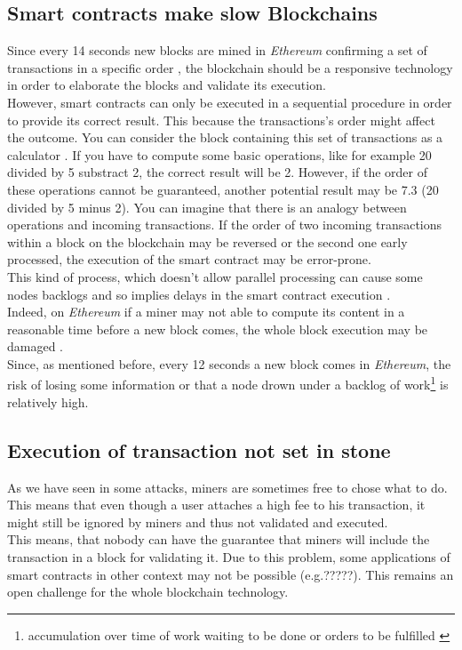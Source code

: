 \subsection{Smart contracts make slow Blockchains}
Since every 14 seconds new blocks are mined in \textit{Ethereum} \cite{sina} confirming a set of transactions in a specific order \cite{challenge3}, the blockchain should be a responsive technology in order to elaborate the blocks and validate its execution. \\
However, smart contracts can only be executed in a sequential procedure \cite{challenge3} in order to provide its correct result. This because the transactions's order might affect the outcome. You can consider the block containing this set of transactions as a calculator \cite{challenge1}. If you have to compute some basic operations, like for example 20 divided by 5 substract 2, the correct result will be 2. However, if the order of these operations cannot be guaranteed, another potential result may be 7.3 (20 divided by 5 minus 2). 
You can imagine that there is an analogy between operations and incoming transactions. If the order of two incoming transactions within a block on the blockchain may be reversed or the second one early processed, the execution of the smart contract may be error-prone. \\
This kind of process, which doesn't allow parallel processing can cause some nodes backlogs and so implies delays in the smart contract execution \cite{challenge1}. \\
Indeed, on \textit{Ethereum} if a miner may not able to compute its content in a reasonable time before a new block comes, the whole block execution may be damaged \cite{challenge1}. \\
Since, as mentioned before, every 12 seconds a new block comes in \textit{Ethereum}, the risk of losing some information or that a node drown under a backlog of work\footnote{accumulation over time of work waiting to be done or orders to be fulfilled \cite{challenge4}} is relatively high.

\subsection{Execution of transaction not set in stone}
As we have seen in some attacks, miners are sometimes free to chose what to do. This means that even though a user attaches a high fee to his transaction, it might still be ignored by miners and thus not validated and executed.\\
This means, that nobody can have the guarantee that miners will include the transaction in a block for validating it.
Due to this problem, some applications of smart contracts in other context may not be possible (e.g.?????). 
This remains an open challenge for the whole blockchain technology. 

